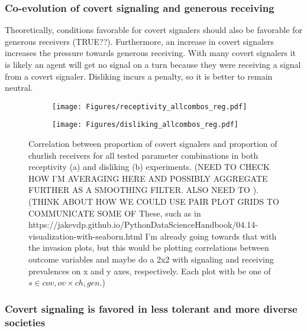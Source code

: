 \documentclass[11pt,letterpaper]{article}
\begin{document}


\subsubsection{Co-evolution of covert signaling and generous receiving}


Theoretically, conditions favorable for covert
signalers should also be favorable for generous receivers (TRUE??). Furthermore, 
an increase in covert signalers increases the pressure towards generous receiving.
With many covert signalers it is likely an agent will get no signal on a 
turn because they were receiving a signal from a covert signaler. Disliking
incurs a penalty, so it is better to remain neutral.


\begin{figure}[H]
  \centering
  \begin{subfigure}{0.49\textwidth}
    \centering
    \texttt{[image: Figures/receptivity\_allcombos\_reg.pdf]}
    \caption{}
    \label{fig:}
  \end{subfigure}
  \begin{subfigure}{0.49\textwidth}
    \centering
    \texttt{[image: Figures/disliking\_allcombos\_reg.pdf]}
    \caption{}
    \label{fig:}
  \end{subfigure}
  \caption{Correlation between proportion of covert signalers and proportion of
    churlish receivers for all tested parameter combinations in both 
    receptivity (a) and disliking (b) experiments. (NEED TO CHECK HOW I'M AVERAGING
    HERE AND POSSIBLY AGGREGATE FURTHER AS A SMOOTHING FILTER. ALSO NEED TO
). (THINK ABOUT HOW WE COULD USE PAIR PLOT GRIDS TO COMMUNICATE SOME OF
These, such as in https://jakevdp.github.io/PythonDataScienceHandbook/04.14-visualization-with-seaborn.html
I'm already going towards that with the invasion plots, but this would be
plotting correlations between outcome variables and maybe do a 2x2 with
signaling and receiving prevalences on x and y axes, respectively. Each plot
with be one of $s \in {cov, ov} \times {ch, gen}$.)}
  
  \label{fig:regressions}
\end{figure}

\subsubsection{Covert signaling is favored in less tolerant and more diverse societies}
\end{document}
